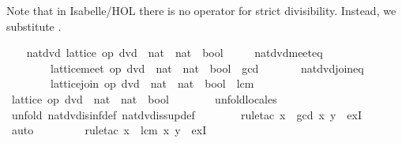 \begin{isabellebody}
%
\endisatagproof
{\isafoldproof}%
%
\isadelimproof
%
\endisadelimproof
%
\begin{isamarkuptext}%
Note that in Isabelle/HOL there is no operator for strict
  divisibility.  Instead, we substitute .%
\end{isamarkuptext}%
\isamarkuptrue%
\ \ \isamarkupfalse%
\ nat{\isacharunderscore}dvd{\isacharcolon}\ lattice\ {\isachardoublequoteopen}op\ dvd\ {\isacharcolon}{\isacharcolon}\ nat\ {\isasymRightarrow}\ nat\ {\isasymRightarrow}\ bool{\isachardoublequoteclose}\isanewline
\ \ \ \ \ nat{\isacharunderscore}dvd{\isacharunderscore}meet{\isacharunderscore}eq{\isacharcolon}\isanewline
\ \ \ \ \ \ \ \ {\isachardoublequoteopen}lattice{\isachardot}meet\ {\isacharparenleft}op\ dvd\ {\isacharcolon}{\isacharcolon}\ nat\ {\isasymRightarrow}\ nat\ {\isasymRightarrow}\ bool{\isacharparenright}\ {\isacharequal}\ gcd{\isachardoublequoteclose}\isanewline
\ \ \ \ \ \ \ nat{\isacharunderscore}dvd{\isacharunderscore}join{\isacharunderscore}eq{\isacharcolon}\isanewline
\ \ \ \ \ \ \ \ {\isachardoublequoteopen}lattice{\isachardot}join\ {\isacharparenleft}op\ dvd\ {\isacharcolon}{\isacharcolon}\ nat\ {\isasymRightarrow}\ nat\ {\isasymRightarrow}\ bool{\isacharparenright}\ {\isacharequal}\ lcm{\isachardoublequoteclose}\isanewline
%
\isadelimproof
\ \ %
\endisadelimproof
%
\isatagproof
{}\isamarkupfalse%
\ {\isacharminus}\isanewline
\ \ \ \ \isamarkupfalse%
\ {\isachardoublequoteopen}lattice\ {\isacharparenleft}op\ dvd\ {\isacharcolon}{\isacharcolon}\ nat\ {\isasymRightarrow}\ nat\ {\isasymRightarrow}\ bool{\isacharparenright}{\isachardoublequoteclose}\isanewline
\ \ \ \ \ \ \isamarkupfalse%
\ unfold{\isacharunderscore}locales\isanewline
\ \ \ \ \ \ \isamarkupfalse%
\ {\isacharparenleft}unfold\ nat{\isacharunderscore}dvd{\isachardot}is{\isacharunderscore}inf{\isacharunderscore}def\ nat{\isacharunderscore}dvd{\isachardot}is{\isacharunderscore}sup{\isacharunderscore}def{\isacharparenright}\isanewline
\ \ \ \ \ \ \isamarkupfalse%
\ {\isacharparenleft}rule{\isacharunderscore}tac\ x\ {\isacharequal}\ {\isachardoublequoteopen}gcd\ x\ y{\isachardoublequoteclose}\ \ exI{\isacharparenright}\isanewline
\ \ \ \ \ \ \isamarkupfalse%
\ auto\ {\isacharbrackleft}{}{\isacharbrackright}\isanewline
\ \ \ \ \ \ \isamarkupfalse%
\ {\isacharparenleft}rule{\isacharunderscore}tac\ x\ {\isacharequal}\ {\isachardoublequoteopen}lcm\ x\ y{\isachardoublequoteclose}\ \ exI{\isacharparenright}\isanewline

\end{isabellebody}

